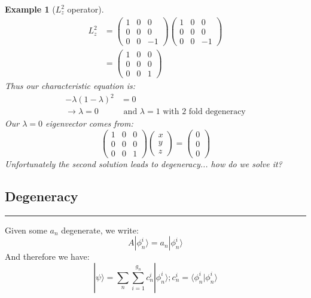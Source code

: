 \documentclass[a4paper, 11pt]{article}
\newtheorem*{Example}{Example}
\begin{document}
\begin{Example}[$L_z^2$ operator]
	\begin{align*}
		L_z^2 &= \begin{pmatrix}1 & 0 & 0 \\ 0 & 0 & 0 \\ 0 & 0 & -1\end{pmatrix}\begin{pmatrix}1 & 0 & 0 \\ 0 & 0 & 0 \\ 0 & 0 & -1\end{pmatrix} \\ 
			&= \begin{pmatrix}1 & 0 & 0 \\ 0 & 0 & 0 \\ 0 & 0 & 1\end{pmatrix}
	\end{align*}
	Thus our characteristic equation is: 
		\begin{align*}
			-\lambda(1-\lambda)^2 &= 0 \\ 
			\rightarrow \lambda = 0 &\text{ and } \lambda = 1 \text { with 2 fold degeneracy} 
		\end{align*}
	Our $\lambda = 0$ eigenvector comes from: 
		\begin{equation*}
			\begin{pmatrix}1 & 0 & 0 \\ 0 & 0 & 0 \\ 0 & 0 & 1\end{pmatrix}\begin{pmatrix}x \\ y \\ z\end{pmatrix} = \begin{pmatrix} 0 \\ 0 \\ 0 \end{pmatrix}
		\end{equation*}
	Unfortunately the second solution leads to degeneracy... how do we solve it? 
\end{Example}



\subsection*{Degeneracy} 
\par\noindent\rule{\textwidth}{0.4pt}
Given some $a_n$ degenerate, we write: 
	\begin{equation*}
		A|\phi_n^i\rangle = a_n |\phi_n^i\rangle 
	\end{equation*}
And therefore we have: 
	\begin{equation}
		|\psi\rangle = \sum_n \sum\limits_{i=1}^{g_n}c_n^i|\phi_n^i\rangle; c_n^i = \langle\phi_n^i|\phi_n^i\rangle
	\end{equation}
	
\end{document}
